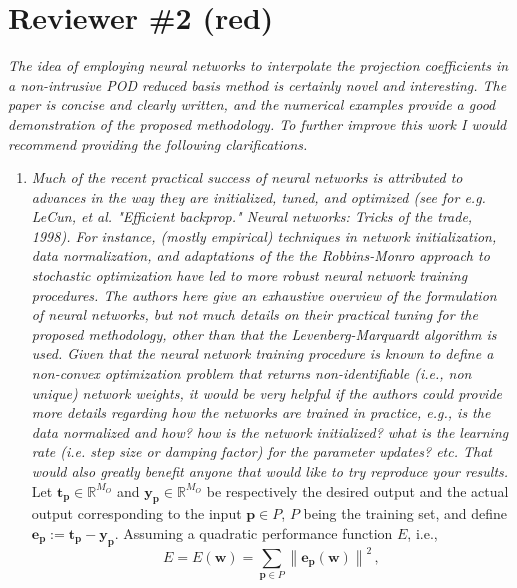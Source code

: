 \documentclass[longtitle]{elsarticle}
\theoremstyle{theorem}
\theoremstyle{definition}
\theoremstyle{remark}
\theoremstyle{proposition}
\numberwithin{figure}{section}
\newcommand{\norm}[1]{\left\lVert#1\right\rVert}
\begin{document}

	\section*{Reviewer \#2 (red)}
		\emph{The idea of employing neural networks to interpolate the projection coefficients in a non-intrusive POD reduced basis method is certainly novel and interesting. The paper is concise and clearly written, and the numerical examples provide a good demonstration of the proposed methodology. To further improve this work I would recommend providing the following clarifications.}
		\begin{enumerate}
			\item \emph{Much of the recent practical success of neural networks is attributed to advances in the way they are initialized, tuned, and optimized (see for e.g. LeCun, et al. "Efficient backprop." Neural networks: Tricks of the trade, 1998). For instance, (mostly empirical) techniques in network initialization, data normalization, and adaptations of the the Robbins-Monro approach to stochastic optimization have led to more robust neural network training procedures. The authors here give an exhaustive overview of the formulation of neural networks, but not much details on their practical tuning for the proposed methodology, other than that the Levenberg-Marquardt algorithm is used. Given that the neural network training procedure is known to define a non-convex optimization problem that returns non-identifiable (i.e., non unique) network weights, it would be very helpful if the authors could provide more details regarding how the networks are trained in practice, e.g., is the data normalized and how? how is the network initialized? what is the learning rate (i.e. step size or damping factor) for the parameter updates? etc. That would also greatly benefit anyone that would like to try reproduce your results.} \\[0.3cm]
			Let $\mathbf{t}_{\mathbf{p}} \in \mathbb{R}^{M_O}$ and $\mathbf{y}_{\mathbf{p}} \in \mathbb{R}^{M_O}$ be respectively the desired output and the actual output corresponding to the input $\mathbf{p} \in P$, $P$ being the training set, and define $\mathbf{e}_{\mathbf{p}} := \mathbf{t}_{\mathbf{p}} - \mathbf{y}_{\mathbf{p}}$. Assuming a quadratic performance function $E$, i.e.,
			\begin{equation*}
				E = E(\mathbf{w}) = \sum_{\mathbf{p} \in P} \norm{\mathbf{e}_{\mathbf{p}}(\mathbf{w})}^2 \, ,
			\end{equation*}

\end{enumerate}
\end{document}
